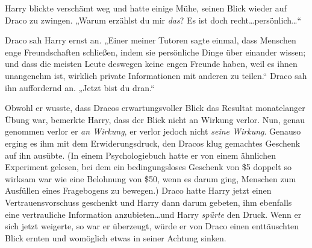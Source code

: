 Harry blickte verschämt weg und hatte einige Mühe, seinen Blick wieder auf Draco zu zwingen. „Warum erzählst du mir \emph{das}? Es ist doch recht…persönlich…“

Draco sah Harry ernst an. „Einer meiner Tutoren sagte einmal, dass Menschen enge Freundschaften schließen, indem sie persönliche Dinge über einander wissen; und dass die meisten Leute deswegen keine engen Freunde haben, weil es ihnen unangenehm ist, wirklich private Informationen mit anderen zu teilen.“ Draco sah ihn auffordernd an. „Jetzt bist du dran.“

Obwohl er wusste, dass Dracos erwartungsvoller Blick das Resultat monatelanger Übung war, bemerkte Harry, dass der Blick nicht an Wirkung verlor. Nun, genau genommen verlor er \emph{an Wirkung}, er verlor jedoch nicht \emph{seine Wirkung}. Genauso erging es ihm mit dem Erwiderungsdruck, den Dracos klug gemachtes Geschenk auf ihn ausübte. (In einem Psychologiebuch hatte er von einem ähnlichen Experiment gelesen, bei dem ein bedingungsloses Geschenk von \$5 doppelt so wirksam war wie eine Belohnung von \$50, wenn es darum ging, Menschen zum Ausfüllen eines Fragebogens zu bewegen.) Draco hatte Harry jetzt einen Vertrauensvorschuss geschenkt und Harry dann darum gebeten, ihm ebenfalls eine vertrauliche Information anzubieten…und Harry \emph{spürte} den Druck. Wenn er sich jetzt weigerte, so war er überzeugt, würde er von Draco einen enttäuschten Blick ernten und womöglich etwas in seiner Achtung sinken.

